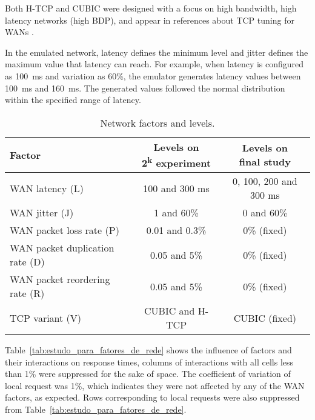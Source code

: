 \documentclass[man,floatsintext,12pt]{apa6}
\begin{document}
Both H-TCP and CUBIC were designed with a focus on high bandwidth, high latency
networks (high BDP), and appear in references about TCP tuning for WANs
\parencite{ESnet2012}.

In the emulated network, latency defines the minimum level and jitter defines
the maximum value that latency can reach. For example, when latency is
configured as 100~ms and variation as 60\%, the emulator generates latency
values between 100~ms and 160~ms. The generated values followed the normal
distribution within the specified range of latency.

\begin{table}[h!]
\caption{Network factors and levels.}
\label{tab:network_factors_and_levels}
\begin{tabular}{lcc} \toprule
Factor & \thead{Levels on \\ 2\textsuperscript{k} experiment} & \thead{Levels on \\final study} \\ \midrule

WAN latency (L) & 100 and 300 ms & 0, 100, 200 and 300 ms\\

WAN jitter (J) & 1 and 60\% & 0 and 60\%\\

WAN packet loss rate (P) & 0.01 and 0.3\% & 0\% (fixed)\\

WAN packet duplication rate (D) & 0.05 and 5\% & 0\% (fixed) \\

WAN packet reordering rate (R) & 0.05 and 5\% & 0\% (fixed) \\

TCP variant (V) & CUBIC and H-TCP & CUBIC (fixed) \\ \bottomrule

\end{tabular}  
\end{table}

Table~\ref{tab:estudo_para_fatores_de_rede} shows the influence of factors and
their interactions on response times, columns of interactions with all cells
less than 1\% were suppressed for the sake of space. The coefficient of
variation of local request was 1\%, which indicates they were not affected by
any of the WAN factors, as expected. Rows corresponding to local requests were
also suppressed from Table~\ref{tab:estudo_para_fatores_de_rede}.
\end{document}
